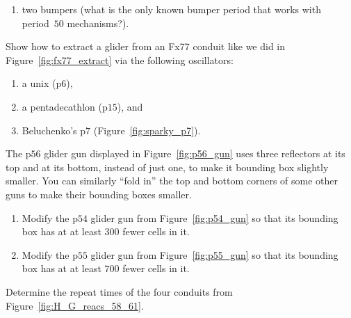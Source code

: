 \begin{multicols}{2}
\begin{problemstar}
\begin{enumerate}[label=\bf\color{ocre}(\alph*)]
			\item two bumpers (what is the only known bumper period that works with period~$50$ mechanisms?).
		\end{enumerate}
	\end{problemstar}
	
	
	\mfilbreak
	
	
	\begin{problem}\label{exer:fx77_extract_other_osc} 
		Show how to extract a glider from an Fx77 conduit like we did in Figure~\ref{fig:fx77_extract} via the following oscillators:\smallskip
		
		\begin{enumerate}[label=\bf\color{ocre}(\alph*)]
			\item a unix (p$6$),
			
			\item a pentadecathlon (p$15$), and
			
			\item Beluchenko's p$7$ (Figure~\ref{fig:sparky_p7}).
		\end{enumerate}
	\end{problem}
	
	
	\mfilbreak
	
	
	\begin{problem}\label{exer:p54_fold_corners} 
		The p$56$ glider gun displayed in Figure~\ref{fig:p56_gun} uses three reflectors at its top and at its bottom, instead of just one, to make it bounding box slightly smaller. You can similarly ``fold in'' the top and bottom corners of some other guns to make their bounding boxes smaller.
		
		\begin{enumerate}[label=\bf\color{ocre}(\alph*)]
			\item Modify the p$54$ glider gun from Figure~\ref{fig:p54_gun} so that its bounding box has at at least $300$ fewer cells in it.
			
			\item Modify the p$55$ glider gun from Figure~\ref{fig:p55_gun} so that its bounding box has at at least $700$ fewer cells in it.
		\end{enumerate}
	\end{problem}
	
	
	\mfilbreak
	
	
	\begin{problem}\label{exer:H_G_reacs_58_61} 
		Determine the repeat times of the four conduits from Figure~\ref{fig:H_G_reacs_58_61}.
	\end{problem}
	

\end{multicols}
